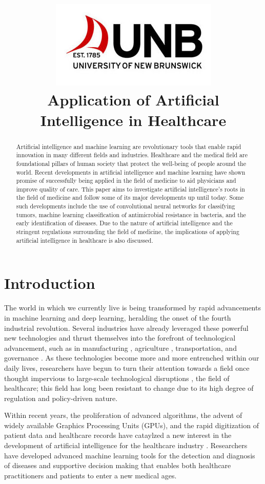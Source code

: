 \documentclass[a4paper]{article}
\title{\includegraphics[scale=0.75]{Resources/unblogo.jpg}\\Application of Artificial Intelligence in Healthcare}
\begin{document}
\maketitle

\begin{abstract}
    Artificial intelligence and machine learning are revolutionary tools that enable rapid innovation in many different fields and industries. Healthcare and the medical field are foundational pillars of human society that protect the well-being of people around the world. Recent developments in artificial intelligence and machine learning have shown promise of successfully being applied in the field of medicine to aid physicians and improve quality of care. This paper aims to investigate artificial intelligence's roots in the field of medicine and follow some of its major developments up until today. Some such developments include the use of convolutional neural networks for classifying tumors, machine learning classification of antimicrobial resistance in bacteria, and the early identification of diseases. Due to the nature of artificial intelligence and the stringent regulations surrounding the field of medicine, the implications of applying artificial intelligence in healthcare is also discussed.   
\end{abstract}

\newpage

\section{Introduction}

The world in which we currently live is being transformed by rapid advancements in machine learning and deep learning, heralding the onset of the fourth industrial revolution. Several industries have already leveraged these powerful new technologies and thrust themselves into the forefront of technological advancement, such as in manufacturing \cite{mohd_2022}, agriculture \cite{rashid_2024}, transportation, and governance \cite{qayyum_2021}. As these technologies become more and more entrenched within our daily lives, researchers have begun to turn their attention towards a field once thought impervious to large-scale technological disruptions \cite{qayyum_2021, latif_2017}, the field of healthcare; this field has long been resistant to change due to its high degree of regulation and policy-driven nature. \

Within recent years, the proliferation of advanced algorithms, the advent of widely available Graphics Processing Units (GPUs), and the rapid digitization of patient data and healthcare records have cataylzed a new interest in the development of artificial intelligence for the healthcare industry \cite{jones_2018}. Researchers have developed advanced machine learning tools for the detection and diagnosis of diseases and supportive decision making that enables both healthcare practitioners and patients to enter a new medical ages. \
\end{document}
